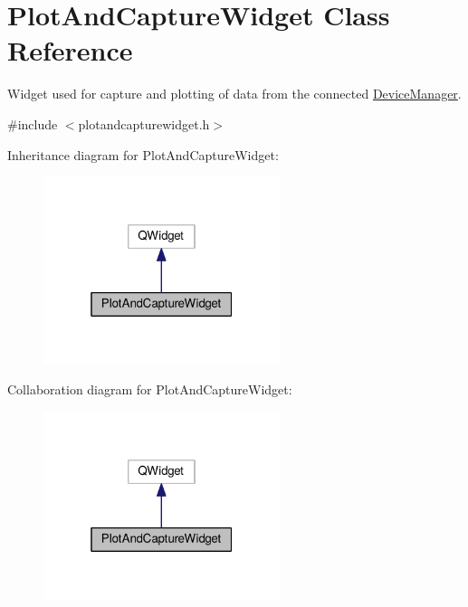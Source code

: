 \hypertarget{classPlotAndCaptureWidget}{}\section{Plot\+And\+Capture\+Widget Class Reference}
\label{classPlotAndCaptureWidget}


Widget used for capture and plotting of data from the connected \hyperlink{classDeviceManager}{Device\+Manager}.  




{\ttfamily \#include $<$plotandcapturewidget.\+h$>$}



Inheritance diagram for Plot\+And\+Capture\+Widget\+:\nopagebreak
\begin{figure}[H]
\begin{center}
\leavevmode
\includegraphics[width=196pt]{classPlotAndCaptureWidget__inherit__graph}
\end{center}
\end{figure}


Collaboration diagram for Plot\+And\+Capture\+Widget\+:\nopagebreak
\begin{figure}[H]
\begin{center}
\leavevmode
\includegraphics[width=196pt]{classPlotAndCaptureWidget__coll__graph}
\end{center}
\end{figure}
